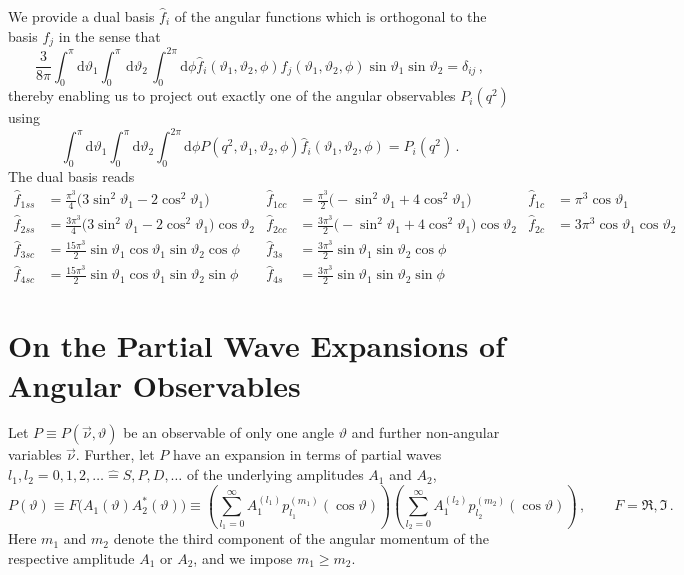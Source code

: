 \documentclass[aps,prd,reprint,nofootinbib,preprintnumbers]{revtex4}
\newcommand{\dd}{\text{d}}
\renewcommand{\theta}{\vartheta}
\begin{document}
We provide a dual basis $\hat{f}_i$ of the angular functions which is orthogonal to the basis $f_j$ in the sense that
\begin{equation}
    \frac{3}{8\pi}\int_0^\pi \dd\theta_1 \int_0^\pi\,\dd\theta_2\, \int_0^{2\pi}\dd \phi \hat{f}_i(\theta_1,\theta_2,\phi) f_j(\theta_1,\theta_2,\phi) \sin\theta_1 \sin\theta_2 = \delta_{ij}\,,
\end{equation}
thereby enabling us to project out exactly one of the angular observables $P_i(q^2)$ using
\begin{equation}
    \int_0^\pi \dd \theta_1 \int_0^\pi \dd \theta_2 \int_0^{2\pi} \dd \phi P(q^2, \theta_1, \theta_2, \phi) \hat{f}_i(\theta_1, \theta_2, \phi) = P_i(q^2)\,.
\end{equation}
The dual basis reads
\begin{equation}
    \begin{aligned}
        \hat f_{1ss} & = \frac{\pi^3}{4}\big(3 \sin^2\theta_1 - 2 \cos^2\theta_1\big) &
        \hat f_{1cc} & = \frac{\pi^3}{2}\big(- \sin^2\theta_1 + 4 \cos^2\theta_1\big) &
        \hat f_{1c}  & = \pi^3 \cos\theta_1\\
        \hat f_{2ss} & = \frac{3\pi^3}{4}\big(3 \sin^2\theta_1 - 2 \cos^2\theta_1\big) \cos\theta_2 &
        \hat f_{2cc} & = \frac{3\pi^3}{2}\big(- \sin^2\theta_1 + 4 \cos^2\theta_1\big) \cos\theta_2 &
        \hat f_{2c}  & = 3\pi^3 \cos\theta_1   \cos\theta_2 \\
        \hat f_{3sc} & = \frac{15\pi^3}{2}\sin\theta_1 \cos\theta_1 \sin\theta_2 \cos\phi &
        \hat f_{3s}  & = \frac{3\pi^3}{2} \sin\theta_1              \sin\theta_2 \cos\phi \\
        \hat f_{4sc} & = \frac{15\pi^3}{2}\sin\theta_1 \cos\theta_1 \sin\theta_2 \sin\phi &
        \hat f_{4s}  & = \frac{3\pi^3}{2} \sin\theta_1              \sin\theta_2 \sin\phi
    \end{aligned}
\end{equation}


\section{On the Partial Wave Expansions of Angular Observables}
\label{app:partial-waves}

Let $P \equiv P(\vec{\nu},\theta)$ be an observable of only one angle $\theta$ and further non-angular variables $\vec{\nu}$. Further, let
$P$ have an expansion in terms of partial waves $l_1, l_2 = 0,1,2,\dots \hat{=} S,P,D,\dots$ of the underlying amplitudes $A_1$ and $A_2$,
\begin{equation}
    \label{eq:def-partial-wave-observable}
    P(\theta) \equiv F\big(A_1(\theta) A_2^*(\theta)\big) \equiv \left(\sum_{l_1=0}^\infty A_1^{(l_1)} p_{l_1}^{(m_1)}(\cos\theta)\right) \left(\sum_{l_2=0}^\infty A_1^{(l_2)} p_{l_2}^{(m_2)}(\cos\theta)\right)\,,\qquad F=\Re{},\Im{}\,.
\end{equation}
Here $m_1$ and $m_2$ denote the third component of the angular momentum of the respective amplitude $A_1$ or $A_2$, and we impose $m_1 \geq m_2$.\\
\end{document}
